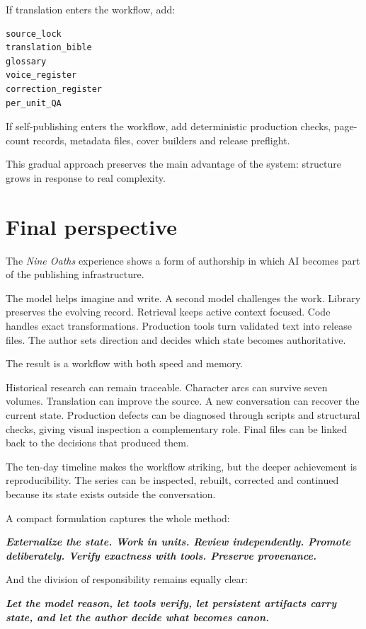 \documentclass[11pt,oneside,openany]{book}
\renewenvironment{quote}{\begin{insightbox}\itshape}{\end{insightbox}}
\begin{document}
If translation enters the workflow, add:

\begin{lstlisting}
source_lock
translation_bible
glossary
voice_register
correction_register
per_unit_QA
\end{lstlisting}

If self-publishing enters the workflow, add deterministic production checks, page-count records, metadata files, cover builders and release preflight.

This gradual approach preserves the main advantage of the system: structure grows in response to real complexity.

\chapter{Final perspective}\label{final-perspective}

The \emph{Nine Oaths} experience shows a form of authorship in which AI becomes part of the publishing infrastructure.

The model helps imagine and write. A second model challenges the work. Library preserves the evolving record. Retrieval keeps active context focused. Code handles exact transformations. Production tools turn validated text into release files. The author sets direction and decides which state becomes authoritative.

The result is a workflow with both speed and memory.

Historical research can remain traceable. Character arcs can survive seven volumes. Translation can improve the source. A new conversation can recover the current state. Production defects can be diagnosed through scripts and structural checks, giving visual inspection a complementary role. Final files can be linked back to the decisions that produced them.

The ten-day timeline makes the workflow striking, but the deeper achievement is reproducibility. The series can be inspected, rebuilt, corrected and continued because its state exists outside the conversation.

A compact formulation captures the whole method:

\begin{quote}
\textbf{Externalize the state. Work in units. Review independently. Promote deliberately. Verify exactness with tools. Preserve provenance.}
\end{quote}

And the division of responsibility remains equally clear:

\begin{quote}
\textbf{Let the model reason, let tools verify, let persistent artifacts carry state, and let the author decide what becomes canon.}
\end{quote}
\end{document}
